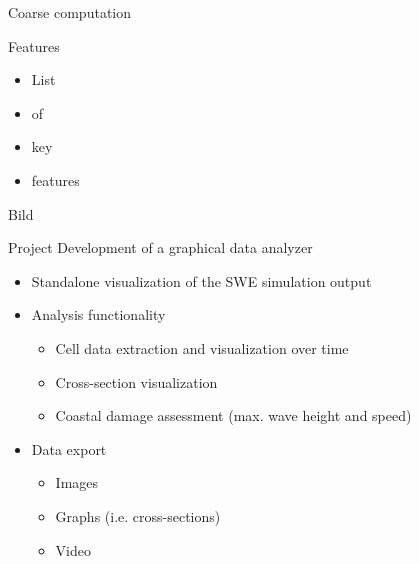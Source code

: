 \documentclass[shortpres,usenames,dvipsnames]{beamer}
\begin{document}
		\begin{frame}{Coarse computation}
			\begin{multicols}{2}
				Features
				\begin{itemize}
					\item List
					\item of
					\item key
					\item features
				\end{itemize}
				\columnbreak
				Bild
			\end{multicols}
			
		\end{frame}
		
		\begin{frame}{Project}
			Development of a graphical data analyzer
			\begin{itemize}
				\item Standalone visualization of the SWE simulation output
				\item Analysis functionality
				\begin{itemize}
					\item Cell data extraction and visualization over time
					\item Cross-section visualization
					\item Coastal damage assessment (max. wave height and speed)
				\end{itemize}
				\item Data export
				\begin{itemize}
					\item Images
					\item Graphs (i.e. cross-sections)
					\item Video
				\end{itemize}
			\end{itemize}
		\end{frame}
		
\end{document}
